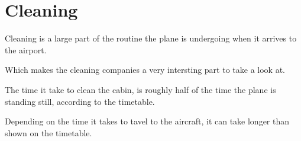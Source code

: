 \section{Cleaning}
Cleaning is a large part of the routine the plane is undergoing when it arrives to the airport.

Which makes the cleaning companies a very intersting part to take a look at.

The time it take to clean the cabin, is roughly half of the time the plane is standing still, according to the timetable.

Depending on the time it takes to tavel to the aircraft, it can take longer than shown on the timetable.





